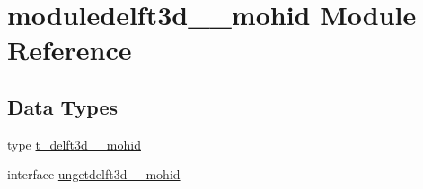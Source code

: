 \hypertarget{namespacemoduledelft3d__2__mohid}{}\section{moduledelft3d\+\_\+\_\+mohid Module Reference}
\label{namespacemoduledelft3d__2__mohid}
\subsection*{Data Types}
\begin{DoxyCompactItemize}
\item 
type \mbox{\hyperlink{structmoduledelft3d__2__mohid_1_1t__delft3d__2__mohid}{t\+\_\+delft3d\+\_\+\_\+mohid}}
\item 
interface \mbox{\hyperlink{interfacemoduledelft3d__2__mohid_1_1ungetdelft3d__2__mohid}{ungetdelft3d\+\_\+\_\+mohid}}
\end{DoxyCompactItemize}
